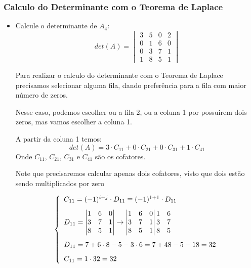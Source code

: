\documentclass[12pt]{article}
\begin{document}
    \subsubsection{Calculo do Determinante com o Teorema de Laplace}
    \begin{itemize}
        \item Calcule o determinante de $A_4$:
        \[ det(A) = 
        \begin{vmatrix}
            3 & 5 & 0 & 2 \\
            0 & 1 & 6 & 0 \\
            0 & 3 & 7 & 1 \\
            1 & 8 & 5 & 1
        \end{vmatrix}
        \]
        
        Para realizar o calculo do determinante com o Teorema de Laplace 
        precisamos selecionar alguma fila, dando preferência para a fila com 
        maior número de zeros.

        Nesse caso, podemos escolher ou a fila 2, ou a coluna 1 por possuirem 
        dois zeros, mas vamos escolher a coluna 1.
        
        A partir da coluna 1 temos: 
        \[det(A)=3 \cdot C_{11} + 0 \cdot C_{21} + 0 \cdot C_{31} + 1 \cdot C_{41}\]
        Onde $C_{11}$, $C_{21}$, $C_{31}$ e $C_{41}$ são os cofatores.

        Note que precisaremos calcular apenas dois cofatores, visto que dois 
        estão sendo multiplicados por zero
        
        \[
        \left\{
        \begin{array}{l}
            \vspace{8pt}
            C_{11} = (-1)^{i+j} \cdot D_{11} \equiv (-1)^{1+1}\cdot D_{11} \\
            \vspace{8pt}
            D_{11} = 
            \begin{vmatrix}
                1 & 6 & 0 \\
                3 & 7 & 1 \\
                8 & 5 & 1
            \end{vmatrix}
            \rightarrow
            \begin{vmatrix}
                1 & 6 & 0 \\
                3 & 7 & 1 \\
                8 & 5 & 1
            \end{vmatrix}
            \begin{matrix}
                1 & 6 \\
                3 & 7 \\
                8 & 5 
            \end{matrix} \\
            \vspace{8pt}
            D_{11} = 7 + 6\cdot 8 - 5 - 3\cdot 6 = 7 + 48 - 5 - 18 = 32 \\
            C_{11} = 1 \cdot 32 = 32
        \end{array}
        \right.
        \]


\end{itemize}
\end{document}
